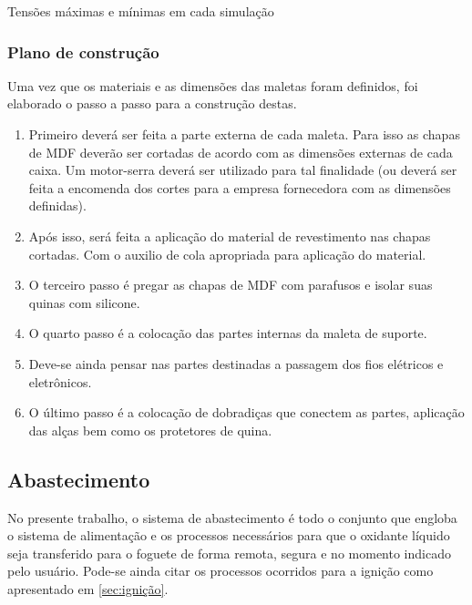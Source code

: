 \begin{table}[H]
\caption{Tensões máximas e mínimas em cada simulação}
\label{tab:ABS}
\end{table}	
	
	
\subsubsection{Plano de construção}

\par Uma vez que os materiais e as dimensões das maletas foram definidos, foi elaborado o passo a passo para a construção destas.

\begin{enumerate}

    \item Primeiro deverá ser feita a parte externa de cada maleta. Para isso as chapas de MDF deverão ser cortadas de acordo com as dimensões externas de cada caixa. Um motor-serra deverá ser utilizado para tal finalidade (ou deverá ser feita a encomenda dos cortes para a empresa fornecedora com as dimensões definidas).
    \item Após isso, será feita a aplicação do material de revestimento nas chapas cortadas. Com o auxilio de cola apropriada para aplicação do material.
    \item O terceiro passo é pregar as chapas de MDF com parafusos e isolar suas quinas com silicone.
    \item O quarto passo é a colocação das partes internas da maleta de suporte. 
    \item Deve-se ainda pensar nas partes destinadas a passagem dos fios elétricos e eletrônicos.  
    \item O último passo é a colocação de dobradiças que conectem as partes, aplicação das alças bem como os protetores de quina.
    
\end{enumerate}

\subsection{Abastecimento}
\label{abastecimento}

\par No presente trabalho, o sistema de abastecimento é todo o conjunto que engloba o sistema de alimentação e os processos necessários para que o oxidante líquido seja transferido para o foguete de forma remota, segura e no momento indicado pelo usuário. Pode-se ainda citar os processos ocorridos para a ignição como apresentado em \ref{sec:ignição}. 

